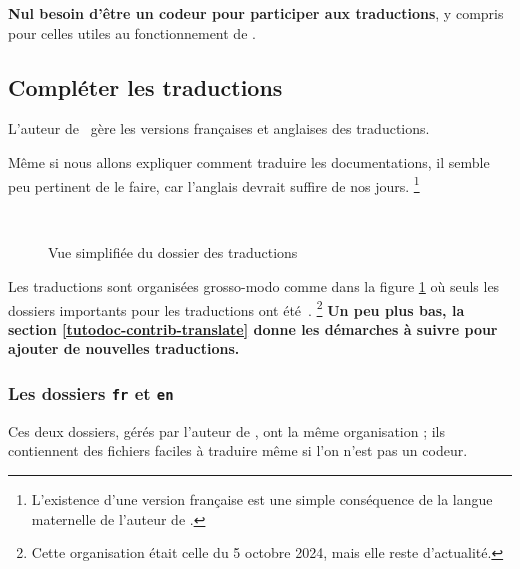 \begin{tdocnote}
    \textbf{Nul besoin d'être un codeur pour participer aux traductions}, y compris pour celles utiles au fonctionnement de \thisproj.
\end{tdocnote}



\subsection{Compléter les traductions}

\begin{tdocnote}
    L'auteur de \thisproj\ gère les versions françaises et anglaises des traductions.
\end{tdocnote}


\begin{tdoccaut}
    Même si nous allons expliquer comment traduire les documentations, il semble peu pertinent de le faire, car l'anglais devrait suffire de nos jours.%
    \footnote{
        L'existence d'une version française est une simple conséquence de la langue maternelle de l'auteur de \thisproj.
    }
\end{tdoccaut}

\begin{figure}[ht]
    \centering
    \contribtranslatedirtree\
    \caption{Vue simplifiée du dossier des traductions}
    \label{tutodoc-contrib-translate-dir}
\end{figure}


Les traductions sont organisées grosso-modo comme dans la figure \ref{tutodoc-contrib-translate-dir} où seuls les dossiers importants pour les traductions ont été \,.%
\footnote{
    Cette organisation était celle du 5 octobre 2024, mais elle reste d'actualité.
}
\textbf{Un peu plus bas, la section \ref{tutodoc-contrib-translate} donne les démarches à suivre pour ajouter de nouvelles traductions.}


\subsubsection{Les dossiers \texttt{fr} et \texttt{en}}

Ces deux dossiers, gérés par l'auteur de \thisproj, ont la même organisation ; ils contiennent des fichiers faciles à traduire même si l'on n'est pas un codeur.


